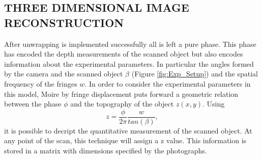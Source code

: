 \subsection{THREE DIMENSIONAL IMAGE RECONSTRUCTION}
After unwrapping is implemented successfully all is left a pure phase. This phase has encoded the depth measurements of the scanned object but also encodes information about the experimental parameters. In particular the angles formed by the camera and the scanned object $\beta$ (Figure \ref{fig:Exp_Setup}) and the spatial frequency of the fringes $w$.
In order to consider the experimental parameters in this model, Moire by fringe displacement puts forward a geometric relation between the phase $\phi$ and the topography of the object $z(x,y)$. Using 
\begin{equation}
    z = \frac{\phi}{2\pi} \frac{w}{tan(\beta)},
    \label{eq:topography}
\end{equation}
it is possible to decript the quantitative measurement of the scanned object. At any point of the scan, this technique will assign a z value. This information is stored in a matrix with dimensions specified by the photographs. 

